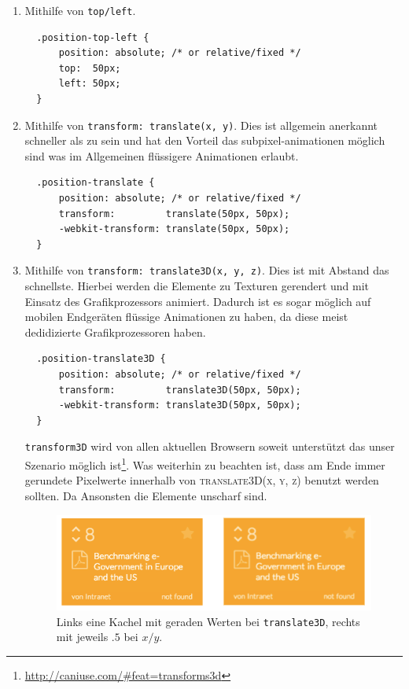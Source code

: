 \documentclass[12pt,twoside]{book}
\begin{document}
\begin{enumerate}
  \item Mithilfe von \texttt{top/left}.\\
  \begin{verbatim}
  .position-top-left {
      position: absolute; /* or relative/fixed */
      top:  50px;
      left: 50px;
  }
  \end{verbatim}
  \item Mithilfe von \texttt{transform: translate(x, y)}. Dies ist allgemein anerkannt schneller als zu sein und hat den Vorteil das subpixel-animationen möglich sind was im Allgemeinen flüssigere Animationen erlaubt. \\
  \begin{verbatim}
  .position-translate {
      position: absolute; /* or relative/fixed */
      transform:         translate(50px, 50px);
      -webkit-transform: translate(50px, 50px);
  }
  \end{verbatim}
  \item Mithilfe von \texttt{transform: translate3D(x, y, z)}. Dies ist mit Abstand das schnellste. Hierbei werden die Elemente zu Texturen gerendert und mit Einsatz des Grafikprozessors animiert. Dadurch ist es sogar möglich auf mobilen Endgeräten flüssige Animationen zu haben, da diese meist dedidizierte Grafikprozessoren haben.
  \begin{verbatim}
  .position-translate3D {
      position: absolute; /* or relative/fixed */
      transform:         translate3D(50px, 50px);
      -webkit-transform: translate3D(50px, 50px);
  }
  \end{verbatim}
  \texttt{transform3D} wird von allen aktuellen Browsern soweit unterstützt das unser Szenario möglich ist\footnote{\url{http://caniuse.com/\#feat=transforms3d}}. Was weiterhin zu beachten ist, dass am Ende immer gerundete Pixelwerte innerhalb von \textsc{translate3D(x, y, z)} benutzt werden sollten. Da Ansonsten die Elemente unscharf sind.

\begin{figure}[H]
	\centering
	\includegraphics[width=1.0\textwidth]{images/blurry_tiles.png}
	\caption{Links eine Kachel mit geraden Werten bei \texttt{translate3D}, rechts mit jeweils $.5$ bei $x/y$.}
	\label{fig:awesome_image}
\end{figure}

\end{enumerate}
\end{document}
